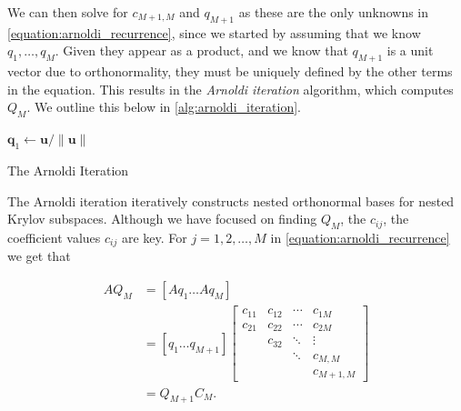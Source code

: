 We can then solve for $c_{M+1,M}$ and $q_{M+1}$ as these are the only unknowns in \cref{equation:arnoldi_recurrence}, since we started by assuming that we know $q_1, \ldots, q_M$. Given they appear as a product, and we know that $q_{M+1}$ is a unit vector due to orthonormality, they must be uniquely defined by the other terms in the equation. This results in the \textit{Arnoldi iteration} algorithm, which computes $Q_M$. We outline this below in \cref{alg:arnoldi_iteration}.

\begin{algorithm}[H]
    \DontPrintSemicolon
    $\mathbf{q}_1 \leftarrow \mathbf{u} / \|\mathbf{u}\|$\; 
    \caption{The Arnoldi Iteration}
    \label{alg:arnoldi_iteration}
\end{algorithm}

The Arnoldi iteration iteratively constructs nested orthonormal bases for nested Krylov subspaces. Although we have focused on finding $Q_M$, the $c_{ij}$, the coefficient values $c_{ij}$ are key. For $j = 1,2,\ldots,M$ in \cref{equation:arnoldi_recurrence} we get that

\begin{align}
AQ_M &= [Aq_1 \ldots Aq_M] \nonumber \\
&= [q_1 \ldots q_{M+1}]
\begin{bmatrix} 
c_{11} & c_{12} & \cdots & c_{1M} \\ 
c_{21} & c_{22} & \cdots & c_{2M} \\ 
       & c_{32} & \ddots & \vdots \\ 
       &        & \ddots & c_{M,M} \\
       &        &        & c_{M+1,M}
\end{bmatrix} \nonumber \\
&= Q_{M+1} C_M.
\label{equation:arnoldi_identity}
\end{align}

